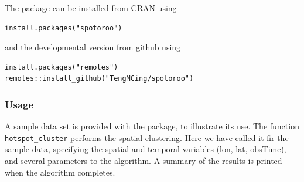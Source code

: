 The package can be installed from CRAN using

\begin{verbatim}
install.packages("spotoroo")
\end{verbatim}

and the developmental version from github using

\begin{verbatim}
install.packages("remotes")
remotes::install_github("TengMCing/spotoroo")
\end{verbatim}

\hypertarget{usage}{%
\subsubsection{Usage}\label{usage}}

A sample data set is provided with the package, to illustrate its use.
The function \texttt{hotspot\_cluster} performs the spatial clustering.
Here we have called it fir the sample data, specifying the spatial and
temporal variables (lon, lat, obsTime), and several parameters to the
algorithm. A summary of the results is printed when the algorithm
completes.

